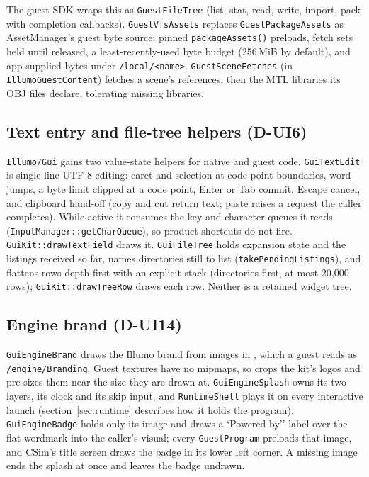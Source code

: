 The guest SDK wraps this as \texttt{GuestFileTree} (list, stat, read, write,
import, pack with completion callbacks). \texttt{GuestVfsAssets} replaces
\texttt{GuestPackageAssets} as AssetManager's guest byte source: pinned
\texttt{packageAssets()} preloads, fetch sets held until released, a
least-recently-used byte budget (256\,MiB by default), and app-supplied bytes
under \texttt{/local/<name>}. \texttt{GuestSceneFetches} (in
\texttt{IllumoGuestContent}) fetches a scene's references, then the MTL
libraries its OBJ files declare, tolerating missing libraries.

\subsection{Text entry and file-tree helpers (D-UI6)}
\texttt{Illumo/Gui} gains two value-state helpers for native and guest code.
\texttt{GuiTextEdit} is single-line UTF-8 editing: caret and selection at
code-point boundaries, word jumps, a byte limit clipped at a code point, Enter
or Tab commit, Escape cancel, and clipboard hand-off (copy and cut return text;
paste raises a request the caller completes). While active it consumes the
key and character queues it reads (\texttt{InputManager::getCharQueue}), so
product shortcuts do not fire. \texttt{GuiKit::drawTextField} draws it.
\texttt{GuiFileTree} holds expansion state and the listings received so far,
names directories still to list (\texttt{takePendingListings}), and flattens
rows depth first with an explicit stack (directories first, at most 20,000
rows); \texttt{GuiKit::drawTreeRow} draws each row. Neither is a retained
widget tree.

\subsection{Engine brand (D-UI14)}
\texttt{GuiEngineBrand} draws the Illumo brand from images in
, which a guest reads as \texttt{/engine/Branding}.
Guest textures have no mipmaps, so  crops the
kit's logos and pre-sizes them near the size they are drawn at.
\texttt{GuiEngineSplash} owns its two layers, its clock and its skip input, and
\texttt{RuntimeShell} plays it on every interactive launch
(section~\ref{sec:runtime} describes how it holds the program).
\texttt{GuiEngineBadge} holds only its image and draws a `Powered by'' label
over the flat wordmark into the caller's visual; every \texttt{GuestProgram}
preloads that image, and CSim's title screen draws the badge in its lower left
corner. A missing image ends the splash at once and leaves the badge undrawn.

